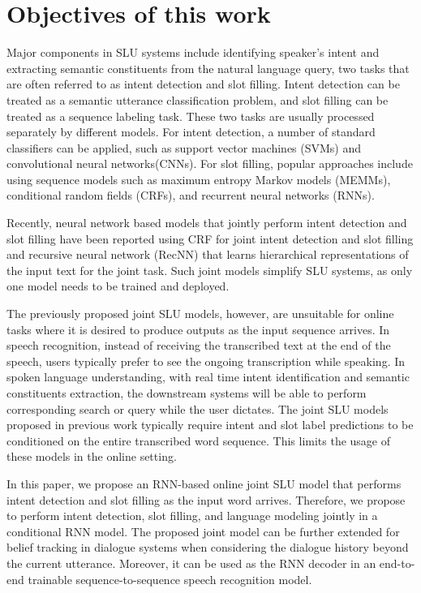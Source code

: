\section{Objectives of this work}
Major components in SLU systems include identifying speaker’s intent and extracting semantic constituents from the natural language query, two tasks that are often referred
to as intent detection and slot filling. Intent detection can be treated as a semantic
utterance classification problem, and slot filling can be treated as a sequence labeling task.
These two tasks are usually processed separately by different models. For intent detection, a
number of standard classifiers can be applied, such as support vector machines (SVMs) and convolutional neural networks(CNNs). For slot filling, popular approaches include using sequence models such as maximum entropy Markov models (MEMMs), conditional random fields (CRFs), and recurrent neural networks (RNNs).
\par
Recently, neural network based models that jointly perform intent detection and slot filling
have been reported using CRF for joint intent detection and slot filling and recursive neural network (RecNN) that learns hierarchical representations of the input text for the
joint task. Such joint models simplify SLU systems, as only one model needs to be trained and
deployed.
\par
The previously proposed joint SLU models, however, are unsuitable for online tasks where it
is desired to produce outputs as the input sequence arrives. In speech recognition, instead of receiving the transcribed text at the end of the speech, users typically prefer to see the ongoing transcription while speaking. In spoken language understanding, with real time intent identification and semantic constituents extraction, the downstream systems
will be able to perform corresponding search
or query while the user dictates. The joint SLU
models proposed in previous work typically require
intent and slot label predictions to be conditioned
on the entire transcribed word sequence.
This limits the usage of these models in the online
setting.
\par
In this paper, we propose an RNN-based online joint SLU model that performs intent detection
and slot filling as the input word arrives. Therefore, we propose to perform intent detection,
slot filling, and language modeling jointly in a conditional RNN model. The proposed joint
model can be further extended for belief tracking in dialogue systems when considering the dialogue history beyond the current utterance. Moreover, it can be used as the RNN decoder in an end-to-end trainable sequence-to-sequence speech recognition model.